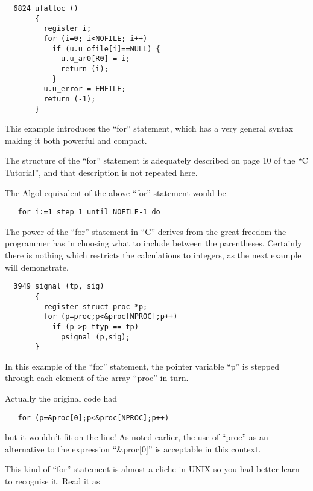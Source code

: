 
\begin{verbatim}
  6824 ufalloc ()
       {
         register i;
         for (i=0; i<NOFILE; i++)
           if (u.u_ofile[i]==NULL) {
             u.u_ar0[R0] = i;
             return (i);
           }
         u.u_error = EMFILE;
         return (-1);
       }
\end{verbatim}

This example introduces the ``for''
statement, which has a very general
syntax making it both powerful and compact.

The structure of the ``for'' statement is
adequately described on page 10 of the
``C Tutorial'', and that description is
not repeated here.

The Algol equivalent of the above ``for''
statement would be

\begin{verbatim}
   for i:=1 step 1 until NOFILE-1 do
\end{verbatim}

The power of the ``for'' statement in ``C''
derives from the great freedom the programmer
has in choosing what to include
between the parentheses. Certainly
there is nothing which restricts the
calculations to integers, as the next
example will demonstrate.



\begin{verbatim}
  3949 signal (tp, sig)
       {
         register struct proc *p;
         for (p=proc;p<&proc[NPROC];p++)
           if (p->p ttyp == tp)
             psignal (p,sig);
       }
\end{verbatim}


In this example of the ``for'' statement,
the pointer variable ``p'' is stepped
through each element of the array
``proc'' in turn.

Actually the original code had

\begin{verbatim}
   for (p=&proc[0];p<&proc[NPROC];p++)
\end{verbatim}

\noindent but it wouldn't fit on the line! As
noted earlier, the use of ``proc'' as an
alternative to the expression
``\&proc[0]'' is acceptable in this context.

This kind of ``for'' statement is almost
a cliche in UNIX so you had better
learn to recognise it. Read it as

\medskip

